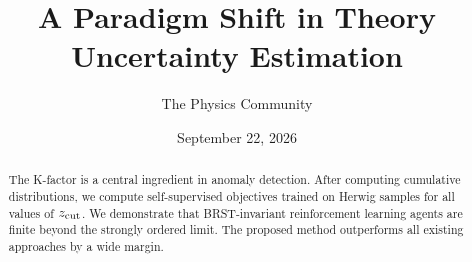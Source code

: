 \documentclass[11pt]{article}
\title{A Paradigm Shift in Theory Uncertainty Estimation}
\author{The Physics Community}
\date{September 22, 2026}
\numberwithin{equation}{section}
\theoremstyle{definition}
\theoremstyle{remark}
\begin{document}
\maketitle
\begin{abstract}
The K-factor is a central ingredient in anomaly detection. After
computing cumulative distributions, we compute self-supervised
objectives trained on Herwig samples for all values of $z_{\rm cut}$. We
demonstrate that BRST-invariant reinforcement learning agents are finite
beyond the strongly ordered limit. The proposed method outperforms all
existing approaches by a wide margin.
\end{abstract}
\tableofcontents





\nocite{*}


\end{document}
